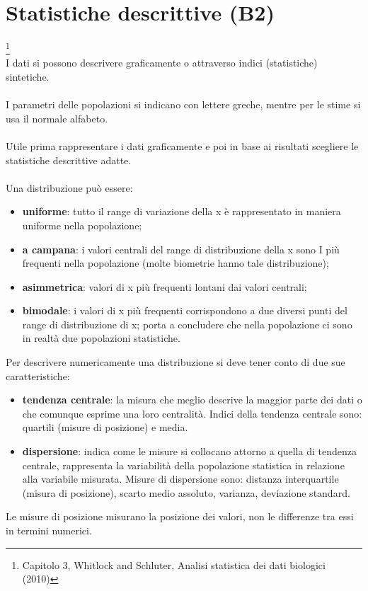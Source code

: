 \documentclass[10pt, draft]{book}
\begin{document}
\chapter{Statistiche descrittive (B2)}\footnote{Capitolo 3, Whitlock and Schluter, Analisi statistica dei dati biologici (2010)}
\\
I dati si possono descrivere graficamente o attraverso indici (statistiche) sintetiche.
\\
\\
I parametri delle popolazioni si indicano con lettere greche, mentre per le stime si usa il normale alfabeto.
\\
\\
Utile prima rappresentare i dati graficamente e poi in base ai risultati scegliere le statistiche descrittive adatte.
\\
\\
Una distribuzione può essere:
\begin{itemize}
    \item \textbf{uniforme}: tutto il range di variazione della x è rappresentato in maniera uniforme nella popolazione;
    \item \textbf{a campana}: i valori centrali del range di distribuzione della x sono I più frequenti nella popolazione (molte biometrie hanno tale distribuzione);
    \item \textbf{asimmetrica}: valori di x più frequenti lontani dai valori centrali;
    \item \textbf{bimodale}: i valori di x più frequenti corrispondono a due diversi punti del range di distribuzione di x; porta a concludere che nella popolazione ci sono in realtà due popolazioni statistiche.
\end{itemize}
Per descrivere numericamente una distribuzione si deve tener conto di due sue caratteristiche:
\begin{itemize}
    \item \textbf{tendenza centrale}: la misura che meglio descrive la maggior parte dei dati o che comunque esprime una loro centralità. Indici della tendenza centrale sono: quartili (misure di posizione) e media.
    \item \textbf{dispersione}: indica come le misure si collocano attorno a quella di tendenza centrale, rappresenta la variabilità della popolazione statistica in relazione alla variabile misurata. Misure di dispersione sono: distanza interquartile (misura di posizione), scarto medio assoluto, varianza, deviazione standard.
\end{itemize}
Le misure di posizione misurano la posizione dei valori, non le differenze tra essi in termini numerici.
\end{document}
